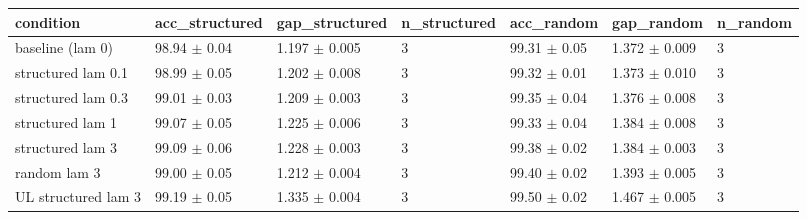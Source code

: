 \begin{tabular}{lllllll}
\hline
condition & acc\_structured & gap\_structured & n\_structured & acc\_random & gap\_random & n\_random \\
\hline
baseline (lam 0) & 98.94 $\pm$ 0.04 & 1.197 $\pm$ 0.005 & 3 & 99.31 $\pm$ 0.05 & 1.372 $\pm$ 0.009 & 3 \\
structured lam 0.1 & 98.99 $\pm$ 0.05 & 1.202 $\pm$ 0.008 & 3 & 99.32 $\pm$ 0.01 & 1.373 $\pm$ 0.010 & 3 \\
structured lam 0.3 & 99.01 $\pm$ 0.03 & 1.209 $\pm$ 0.003 & 3 & 99.35 $\pm$ 0.04 & 1.376 $\pm$ 0.008 & 3 \\
structured lam 1 & 99.07 $\pm$ 0.05 & 1.225 $\pm$ 0.006 & 3 & 99.33 $\pm$ 0.04 & 1.384 $\pm$ 0.008 & 3 \\
structured lam 3 & 99.09 $\pm$ 0.06 & 1.228 $\pm$ 0.003 & 3 & 99.38 $\pm$ 0.02 & 1.384 $\pm$ 0.003 & 3 \\
random lam 3 & 99.00 $\pm$ 0.05 & 1.212 $\pm$ 0.004 & 3 & 99.40 $\pm$ 0.02 & 1.393 $\pm$ 0.005 & 3 \\
UL structured lam 3 & 99.19 $\pm$ 0.05 & 1.335 $\pm$ 0.004 & 3 & 99.50 $\pm$ 0.02 & 1.467 $\pm$ 0.005 & 3 \\
\hline
\end{tabular}

